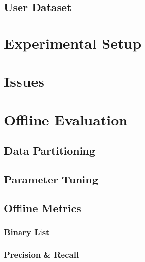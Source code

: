 \subsection{User Dataset}



\section{Experimental Setup}

\section{Issues}

\section{Offline Evaluation}

\subsection{Data Partitioning}

\subsection{Parameter Tuning}

\subsection{Offline Metrics}

\subsubsection{Binary List}

\subsubsection{Precision \& Recall}

